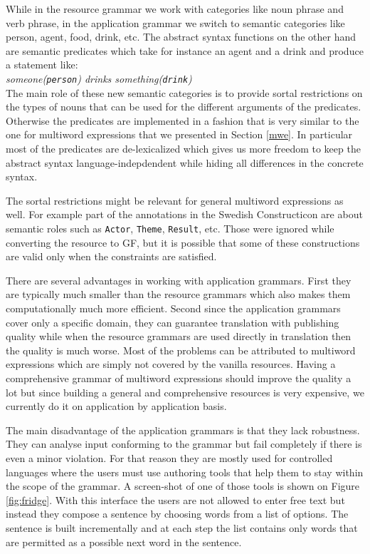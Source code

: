 \documentclass[output=paper]{LSP/langsci}
\begin{document}
While in the resource grammar we work with categories like noun phrase
and verb phrase, in the application grammar we switch to semantic
categories like person, agent, food, drink, etc. The abstract syntax
functions on the other hand are semantic predicates which take for instance
an agent and a drink and produce a statement like:\\[10pt]
%
{\phantom{X}\qquad\qquad \textit{someone(\texttt{person}) drinks something(\texttt{drink})}}\\[10pt]
%
The main role of these new semantic categories is to provide 
sortal restrictions on the types of nouns that can be used for the
different arguments of the predicates. Otherwise the predicates are
implemented in a fashion that is very similar to the one for
multiword expressions that we presented in Section \ref{mwe}.
In particular most of the predicates are de-lexicalized which
gives us more freedom to keep the abstract syntax language-indepdendent
while hiding all differences in the concrete syntax. 

The sortal restrictions might be relevant for general
multiword expressions as well. For example part of the
annotations in the Swedish Constructicon are about semantic roles
such as \texttt{Actor}, \texttt{Theme}, \texttt{Result}, etc.
Those were ignored while converting the resource to GF, but
it is possible that some of these constructions are valid only when
the constraints are satisfied.

There are several advantages in working with application grammars.
First they are typically much smaller than the resource grammars which
also makes them computationally much more efficient. Second since
the application grammars cover only a specific domain, they can
guarantee translation with publishing quality while when the resource
grammars are used directly in translation then the quality is much worse.
Most of the problems can be attributed to multiword expressions
which are simply not covered by the vanilla resources. 
Having a comprehensive grammar of multiword expressions should
improve the quality a lot but since building 
a general and comprehensive resources is very expensive, we currently
do it on application by application basis.

The main disadvantage of the application grammars is that they lack
robustness. They can analyse input conforming to the grammar but
fail completely if there is even a minor violation. For that reason
they are mostly used for controlled languages 
\citep{angelov:2009:icl:1893475.1893482} where the users must use 
authoring tools that help them to stay within the scope of the grammar.
A screen-shot of one of those tools \citep{ranta2010tools}
is shown on Figure \ref{fig:fridge}. With this interface the users
are not allowed to enter free text but instead they compose a sentence
by choosing words from a list of options. The sentence is built
incrementally and at each step the list contains only words
that are permitted as a possible next word in the sentence.
\end{document}
